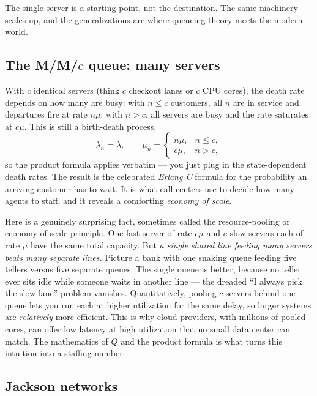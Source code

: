 The single server is a starting point, not the destination. The same machinery scales up, and the
generalizations are where queueing theory meets the modern world.

\subsection{The M/M/$c$ queue: many servers}

With $c$ identical servers (think $c$ checkout lanes or $c$ CPU cores), the death rate depends on how
many are busy: with $n \le c$ customers, all $n$ are in service and departures fire at rate $n\mu$;
with $n > c$, all servers are busy and the rate saturates at $c\mu$. This is still a birth-death
process,
\[
  \lambda_n = \lambda, \qquad
  \mu_n = \begin{cases} n\mu, & n \le c, \\ c\mu, & n > c, \end{cases}
\]
so the product formula applies verbatim --- you just plug in the state-dependent death rates. The
result is the celebrated \emph{Erlang C} formula for the probability an arriving customer has to
wait. It is what call centers use to decide how many agents to staff, and it reveals a comforting
\emph{economy of scale}.

\begin{aestheticbox}
Here is a genuinely surprising fact, sometimes called the resource-pooling or economy-of-scale
principle. One fast server of rate $c\mu$ and $c$ slow servers each of rate $\mu$ have the same total
capacity. But \emph{a single shared line feeding many servers beats many separate lines.} Picture a
bank with one snaking queue feeding five tellers versus five separate queues. The single queue is
better, because no teller ever sits idle while someone waits in another line --- the dreaded
``I always pick the slow lane'' problem vanishes. Quantitatively, pooling $c$ servers behind one
queue lets you run each at higher utilization for the same delay, so larger systems are
\emph{relatively} more efficient. This is why cloud providers, with millions of pooled cores, can
offer low latency at high utilization that no small data center can match. The mathematics of $Q$ and
the product formula is what turns this intuition into a staffing number.
\end{aestheticbox}

\subsection{Jackson networks}

